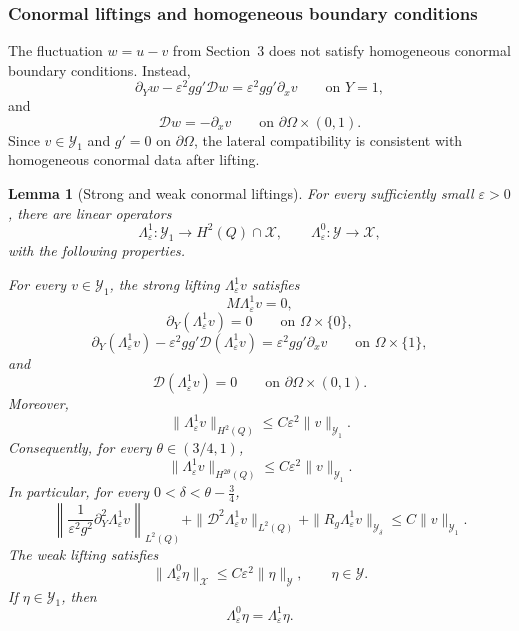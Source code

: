 \documentclass[11pt]{article}
\newtheorem{lemma}[theorem]{Lemma}
\theoremstyle{definition}
\theoremstyle{remark}
\numberwithin{equation}{section}
\begin{document}
\subsubsection*{Conormal liftings and homogeneous boundary conditions}
\label{subsubsec:thin-domain-conormal-liftings}

The fluctuation \(w=u-v\) from Section~3 does not satisfy homogeneous conormal
boundary conditions. Instead,
\[
\partial_Yw-\varepsilon^2gg'\mathcal Dw
=
\varepsilon^2gg'\partial_xv
\qquad\text{on }Y=1,
\]
and
\[
\mathcal Dw=-\partial_xv
\qquad\text{on }\partial\Omega\times(0,1).
\]
Since \(v\in\mathcal Y_1\) and \(g'=0\) on \(\partial\Omega\), the lateral
compatibility is consistent with homogeneous conormal data after lifting.

\begin{lemma}[Strong and weak conormal liftings]
\label{lem:strong-weak-conormal-lifting}
For every sufficiently small \(\varepsilon>0\), there are linear operators
\[
\Lambda_\varepsilon^1:\mathcal Y_1\to H^2(Q)\cap\mathcal X,
\qquad
\Lambda_\varepsilon^0:\mathcal Y\to\mathcal X,
\]
with the following properties.

For every \(v\in\mathcal Y_1\), the strong lifting
\(\Lambda_\varepsilon^1v\) satisfies
\[
M\Lambda_\varepsilon^1v=0,
\]
\[
\partial_Y(\Lambda_\varepsilon^1v)=0
\qquad\text{on }\Omega\times\{0\},
\]
\[
\partial_Y(\Lambda_\varepsilon^1v)
-
\varepsilon^2gg'\mathcal D(\Lambda_\varepsilon^1v)
=
\varepsilon^2gg'\partial_xv
\qquad\text{on }\Omega\times\{1\},
\]
and
\[
\mathcal D(\Lambda_\varepsilon^1v)=0
\qquad\text{on }\partial\Omega\times(0,1).
\]
Moreover,
\[
\|\Lambda_\varepsilon^1v\|_{H^2(Q)}
\le
C\varepsilon^2\|v\|_{\mathcal Y_1}.
\]
Consequently, for every \(\theta\in(3/4,1)\),
\[
\|\Lambda_\varepsilon^1v\|_{H^{2\theta}(Q)}
\le
C\varepsilon^2\|v\|_{\mathcal Y_1}.
\]
In particular, for every \(0<\delta<\theta-\frac34\),
\[
\left\|
\frac1{\varepsilon^2g^2}\partial_Y^2\Lambda_\varepsilon^1v
\right\|_{L^2(Q)}
+
\|\mathcal D^2\Lambda_\varepsilon^1v\|_{L^2(Q)}
+
\|R_g\Lambda_\varepsilon^1v\|_{\mathcal Y_\delta}
\le
C\|v\|_{\mathcal Y_1}.
\]
The weak lifting satisfies
\[
\|\Lambda_\varepsilon^0\eta\|_{\mathcal X}
\le
C\varepsilon^2\|\eta\|_{\mathcal Y},
\qquad \eta\in\mathcal Y.
\]
If \(\eta\in\mathcal Y_1\), then
\[
\Lambda_\varepsilon^0\eta=\Lambda_\varepsilon^1\eta .
\]
\end{lemma}
\end{document}
